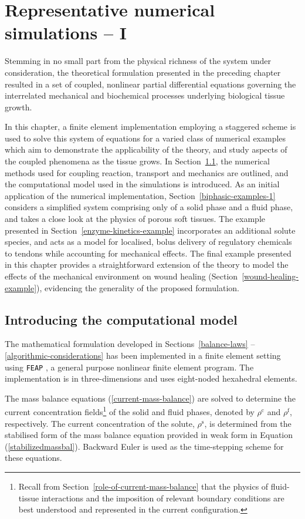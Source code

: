 \chapter{Representative numerical simulations -- I}
\label{numerical-simulations-1}

Stemming in no small part from the physical richness of the system
under consideration, the theoretical formulation presented in the
preceding chapter resulted in a set of coupled, nonlinear partial
differential equations governing the interrelated mechanical and
biochemical processes underlying biological tissue growth.

In this chapter, a finite element implementation employing a staggered
scheme is used to solve this system of equations for a varied class of
numerical examples which aim to demonstrate the applicability of the
theory, and study aspects of the coupled phenomena as the tissue
grows. In Section~\ref{computational-model}, the numerical methods
used for coupling reaction, transport and mechanics are outlined, and
the computational model used in the simulations is introduced. As an
initial application of the numerical implementation,
Section~\ref{biphasic-examples-1} considers a simplified system
comprising only of a solid phase and a fluid phase, and takes a close
look at the physics of porous soft tissues. The example presented in
Section~\ref{enzyme-kinetics-example} incorporates an additional
solute species, and acts as a model for localised, bolus delivery of
regulatory chemicals to tendons while accounting for mechanical
effects. The final example presented in this chapter provides a
straightforward extension of the theory to model the effects of the
mechanical environment on wound healing
(Section~\ref{wound-healing-example}), evidencing the generality of
the proposed formulation.

\section{Introducing the computational model}
\label{computational-model}

The mathematical formulation developed in Sections~\ref{balance-laws}%
--\ref{algorithmic-considerations} has been implemented in a finite
element setting using {\tt FEAP} \citep{FEAPmanual}, a general purpose
nonlinear finite element program. The implementation is in
three-dimensions and uses eight-noded hexahedral elements.

The mass balance equations (\ref{current-mass-balance}) are solved to
determine the current concentration fields\footnote{Recall from
  Section~\ref{role-of-current-mass-balance} that the physics of
  fluid-tissue interactions and the imposition of relevant boundary
  conditions are best understood and represented in the current
  configuration.} of the solid and fluid phases, denoted by
$\rho^{\mathrm{c}}$ and $\rho^{\mathrm{f}}$, respectively. The current
concentration of the solute, $\rho^{\mathrm{s}}$, is determined from
the stabilised form of the mass balance equation provided in weak form
in Equation (\ref{stabilizedmassbal}). Backward Euler is used as the
time-stepping scheme for these equations.

